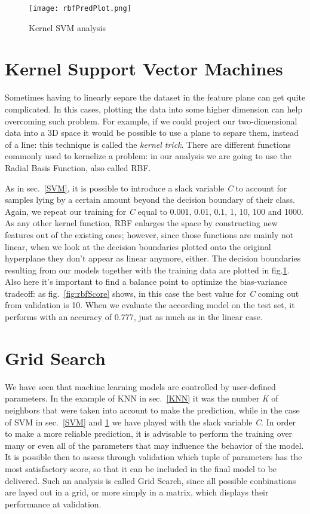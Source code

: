 \documentclass[11pt,twoside,a4paper]{article}
\begin{document}
\begin{figure}[!b]
  \begin{center}
  \texttt{[image: rbfPredPlot.png]}
  \caption{Kernel SVM analysis}
  \label{fig:rbfPred}
  \end{center}
\end{figure}

\section{Kernel Support Vector Machines}
\label{RBF}
Sometimes having to linearly separe the dataset in the feature plane can get quite complicated. In this cases, plotting the data into some higher dimension can help overcoming such problem. For example, if we could project our two-dimensional data into a 3D space it would be possible to use a plane to separe them, instead of a line: this technique is called the \emph{kernel trick}. There are different functions commonly used to kernelize a problem: in our analysis we are going to use the Radial Basis Function, also called RBF.

As in sec.~\ref{SVM}, it is possible to introduce a slack variable \emph{C} to account for samples lying by a certain amount beyond the decision boundary of their class. Again, we repeat our training for \emph{C} equal to 0.001, 0.01, 0.1, 1, 10, 100 and 1000. As any other kernel function, RBF enlarges the space by constructing new features out of the existing ones; however, since those functions are mainly not linear, when we look at the decision boundaries plotted onto the original hyperplane they don't appear as linear anymore, either. The decision boundaries resulting from our models together with the training data are plotted in fig.\ref{fig:rbfPred}.\newline
Also here it's important to find a balance point to optimize the bias-variance tradeoff: as fig.~\ref{fig:rbfScore} shows, in this case the best value for \emph{C} coming out from validation is 10. When we evaluate the according model on the test set, it performs with an accuracy of 0.777, just as much as in the linear case.


\section{Grid Search}
We have seen that machine learning models are controlled by user-defined parameters. In the example of KNN in sec.~\ref{KNN} it was the number \emph{K} of neighbors that were taken into account to make the prediction, while in the case of SVM in sec.~\ref{SVM} and \ref{RBF} we have played with the slack variable \emph{C}.\newline
In order to make a more reliable prediction, it is advisable to perform the training over many or even all of the parameters that may influence the behavior of the model. It is possible then to assess through validation which tuple of parameters has the most satisfactory score, so that it can be included in the final model to be delivered. Such an analysis is called Grid Search, since all possible conbinations are layed out in a grid, or more simply in a matrix, which displays their performance at validation.
\end{document}

